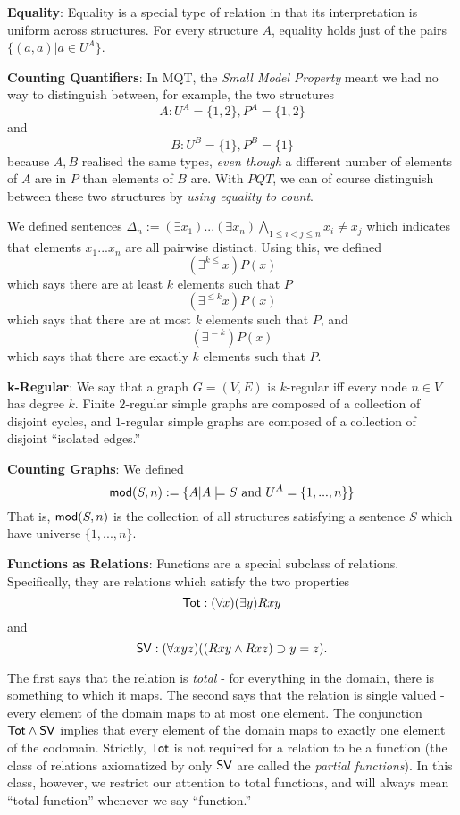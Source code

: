 \begin{mdframed}[linewidth=1]
\textbf{Equality}: Equality is a special type of relation in that its interpretation is uniform across structures. For every structure $A$, equality holds just of the pairs $\{(a, a) | a \in U^A\}$.

\textbf{Counting Quantifiers}: In MQT, the \emph{Small Model Property} meant we had no way to distinguish between, for example, the two structures 
\[
    A: U^A = \{1, 2\}, P^A = \{1, 2\}
\]
and
\[
    B: U^B = \{1\}, P^B = \{1\}
\]
because $A, B$ realised the same types, \emph{even though} a different number of elements of $A$ are in $P$ than elements of $B$ are. With $PQT$, we can of course distinguish between these two structures by \emph{using equality to count}. 

We defined sentences $\Delta_n:= (\exists x_1)...(\exists x_n)\bigwedge_{1 \leq i < j \leq n}x_i \neq x_j$ which indicates that elements $x_1...x_n$ are all pairwise distinct. Using this, we defined
\[
    (\exists^{k \leq}x)P(x)
\]
which says there are at least $k$ elements such that $P$
\[
    (\exists^{\leq k}x)P(x)
\]
which says that there are at most $k$ elements such that $P$, and
\[
    (\exists^{=k})P(x)
\]
which says that there are exactly $k$ elements such that $P$. 

\textbf{k-Regular}: We say that a graph $G=(V,E)$ is $k$-regular iff every node $n \in V$ has degree $k$. Finite $2$-regular simple graphs are composed of a collection of disjoint cycles, and $1$-regular simple graphs are composed of a collection of disjoint ``isolated edges.'' 

\textbf{Counting Graphs}: We defined
\[
    \mbox{$\mathsf{mod}(S,n)$} := \{A | A \models S \mbox{ and }U^A = \{1,...,n\}\}
\]
That is, $\mbox{$\mathsf{mod}(S,n)$}$ is the collection of all structures satisfying a sentence $S$ which have universe $\{1,...,n\}$. 

\textbf{Functions as Relations}:
Functions are a special subclass of relations. Specifically, they are relations which satisfy the two properties 
\[
    \mbox{$\mathsf{Tot}$}: (\forall x)(\exists y)Rxy
\]
and
\[
    \mbox{$\mathsf{SV}$}: (\forall xyz)((Rxy \land Rxz) \supset y = z).
\]

The first says that the relation is \emph{total} - for everything in the domain, there is something to which it maps. The second says that the relation is single valued - every element of the domain maps to at most one element. The conjunction $\mbox{$\mathsf{Tot}$} \land \mbox{$\mathsf{SV}$}$ implies that every element of the domain maps to exactly one element of the codomain. 
Strictly, $\mbox{$\mathsf{Tot}$}$ is not required for a relation to be a function (the class of relations axiomatized by only $\mbox{$\mathsf{SV}$}$ are called the \emph{partial functions}). In this class, however, we restrict our attention to total functions, and will always mean ``total function'' whenever we say ``function.'' 


\end{mdframed}
